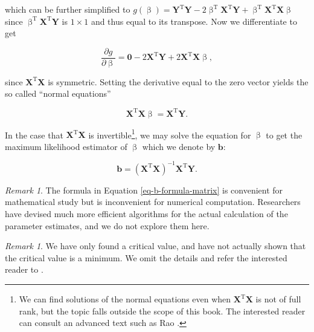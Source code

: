 \documentclass[]{book}
\let\rmarkdownfootnote\footnote%
\def\footnote{\protect\rmarkdownfootnote}
\numberwithin{equation}{chapter}
\numberwithin{figure}{chapter}
\theoremstyle{plain}
\theoremstyle{definition}
\theoremstyle{remark}
\newtheorem{rem}[thm]{Remark}
\theoremstyle{definition}
\theoremstyle{definition}
\theoremstyle{remark}
\let\BeginKnitrBlock\begin \let\EndKnitrBlock\end
\begin{document}
which can be further simplified to
\(g(\upbeta)=\mathbf{Y}^{\mathrm{T}}\mathbf{Y}-2\upbeta^{\mathrm{T}}\mathbf{X}^{\mathrm{T}}\mathbf{Y}+\upbeta^{\mathrm{T}}\mathbf{X}^{\mathrm{T}}\mathbf{X}\upbeta\)
since \(\upbeta^{\mathrm{T}}\mathbf{X}^{\mathrm{T}}\mathbf{Y}\) is
\(1\times1\) and thus equal to its transpose. Now we differentiate to
get

\begin{equation}
\frac{\partial g}{\partial\upbeta}=\mathbf{0}-2\mathbf{X}^{\mathrm{T}}\mathbf{Y}+2\mathbf{X}^{\mathrm{T}}\mathbf{X}\upbeta,
\end{equation}

since \(\mathbf{X}^{\mathrm{T}}\mathbf{X}\) is symmetric. Setting the
derivative equal to the zero vector yields the so called ``normal
equations'' 

\begin{equation}
\mathbf{X}^{\mathrm{T}}\mathbf{X}\upbeta=\mathbf{X}^{\mathrm{T}}\mathbf{Y}.
\end{equation}

In the case that \(\mathbf{X}^{\mathrm{T}}\mathbf{X}\) is
invertible\footnote{We can find solutions of the normal equations even
  when \(\mathbf{X}^{\mathrm{T}}\mathbf{X}\) is not of full rank, but
  the topic falls outside the scope of this book. The interested reader
  can consult an advanced text such as Rao \autocite{Rao1999}.}, we may
solve the equation for \(\upbeta\) to get the maximum likelihood
estimator of \(\upbeta\) which we denote by \(\mathbf{b}\):

\begin{equation}
\label{eq-b-formula-matrix}
\mathbf{b}=\left(\mathbf{X}^{\mathrm{T}}\mathbf{X}\right)^{-1}\mathbf{X}^{\mathrm{T}}\mathbf{Y}.
\end{equation}

\bigskip

\begin{rem}
The formula in Equation \eqref{eq-b-formula-matrix} is convenient for
mathematical study but is inconvenient for numerical computation.
Researchers have devised much more efficient algorithms for the actual
calculation of the parameter estimates, and we do not explore them here.
\end{rem}

\bigskip

\BeginKnitrBlock{rem}
We have only found a critical value, and have not actually shown that
the critical value is a minimum. We omit the details and refer the
interested reader to \autocite{Rao1999}.
\EndKnitrBlock{rem}
\end{document}
